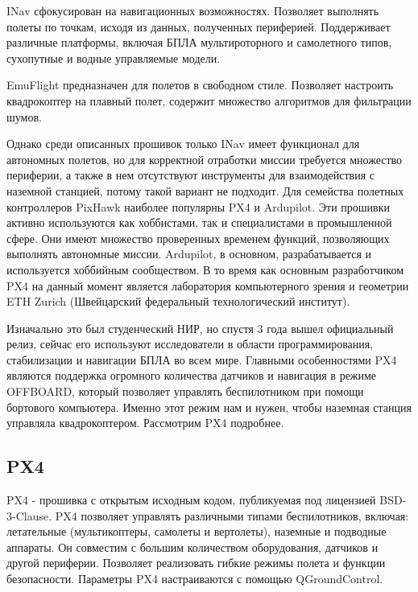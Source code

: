INav сфокусирован на навигационных возможностях. Позволяет выполнять полеты по точкам, исходя из данных, полученных периферией. Поддерживает различные платформы, включая БПЛА мультироторного и самолетного типов, сухопутные и водные управляемые модели.

EmuFlight предназначен для полетов в свободном стиле. Позволяет настроить квадрокоптер на плавный полет, содержит множество алгоритмов для фильтрации шумов.

Однако среди описанных прошивок только INav имеет функционал для автономных полетов, но для корректной отработки миссии требуется множество периферии, а также в нем отсутствуют инструменты для взаимодействия с наземной станцией, потому такой вариант не подходит.
Для семейства полетных контроллеров PixHawk наиболее популярны PX4 и Ardupilot. Эти прошивки активно используются как хоббистами, так и специалистами в промышленной сфере. Они имеют множество проверенных временем функций, позволяющих выполнять автономные миссии. Ardupilot, в основном, разрабатывается и используется хоббийным сообществом. В то время как основным разработчиком PX4 на данный момент является лаборатория компьютерного зрения и геометрии ETH Zurich (Швейцарский федеральный технологический институт).


Изначально это был студенческий НИР, но спустя 3 года вышел официальный релиз, сейчас его используют исследователи в области программирования, стабилизации и навигации БПЛА во всем мире. Главными особенностями PX4 являются поддержка огромного количества датчиков и навигация в режиме OFFBOARD, который позволяет управлять беспилотником при помощи бортового компьютера. Именно этот режим нам и нужен, чтобы наземная станция управляла квадрокоптером. Рассмотрим PX4 подробнее.

\subsection{PX4}

PX4 - прошивка с открытым исходным кодом, публикуемая под лицензией BSD-3-Clause. PX4 позволяет управлять различными типами беспилотников, включая: летательные (мультикоптеры, самолеты и вертолеты), наземные и подводные аппараты. Он совместим с большим количеством оборудования, датчиков и другой периферии. Позволяет реализовать гибкие режимы полета и функции безопасности.
Параметры PX4 настраиваются с помощью Q\-Ground\-Control.\cite{px4}

